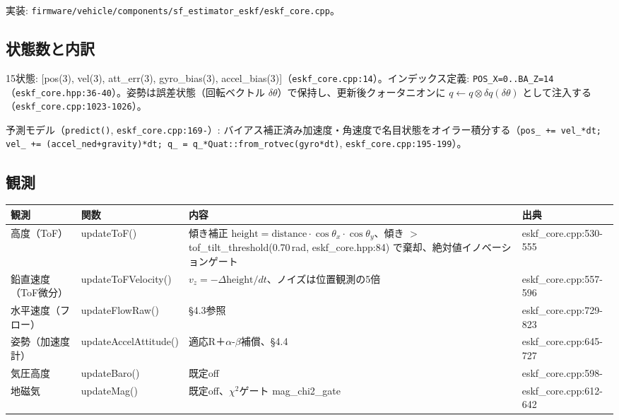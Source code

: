 \documentclass[a4paper,10pt]{ltjsarticle}
\begin{document}
実装: \texttt{firmware/vehicle/components/sf\_estimator\_eskf/eskf\_core.cpp}。

\subsection{状態数と内訳}

15状態: [pos(3), vel(3), att\_err(3), gyro\_bias(3), accel\_bias(3)]（\texttt{eskf\_core.cpp:14}）。インデックス定義: \texttt{POS\_X=0..BA\_Z=14}（\texttt{eskf\_core.hpp:36-40}）。姿勢は誤差状態（回転ベクトル $\delta\theta$）で保持し、更新後クォータニオンに $q \leftarrow q \otimes \delta q(\delta\theta)$ として注入する（\texttt{eskf\_core.cpp:1023-1026}）。

予測モデル（\texttt{predict()}, \texttt{eskf\_core.cpp:169-}）: バイアス補正済み加速度・角速度で名目状態をオイラー積分する（\texttt{pos\_ += vel\_*dt; vel\_ += (accel\_ned+gravity)*dt; q\_ = q\_*Quat::from\_rotvec(gyro*dt)}, \texttt{eskf\_core.cpp:195-199}）。

\subsection{観測}

\begin{table}[h]
\centering\footnotesize
\begin{tabularx}{\textwidth}{@{}llYl@{}}
\toprule
観測 & 関数 & 内容 & 出典 \\
\midrule
高度（ToF） & updateToF() & 傾き補正 $\mathrm{height} = \mathrm{distance} \cdot \cos\theta_x \cdot \cos\theta_y$、傾き $>$ tof\_tilt\_threshold(0.70\,rad, eskf\_core.hpp:84) で棄却、絶対値イノベーションゲート & eskf\_core.cpp:530-555 \\
鉛直速度（ToF微分） & updateToFVelocity() & $v_z = -\Delta\mathrm{height}/dt$、ノイズは位置観測の5倍 & eskf\_core.cpp:557-596 \\
水平速度（フロー） & updateFlowRaw() & \S4.3参照 & eskf\_core.cpp:729-823 \\
姿勢（加速度計） & updateAccelAttitude() & 適応R＋$\alpha$-$\beta$補償、\S4.4 & eskf\_core.cpp:645-727 \\
気圧高度 & updateBaro() & 既定off & eskf\_core.cpp:598- \\
地磁気 & updateMag() & 既定off、$\chi^2$ゲート mag\_chi2\_gate & eskf\_core.cpp:612-642 \\
\bottomrule
\end{tabularx}
\end{table}
\end{document}
